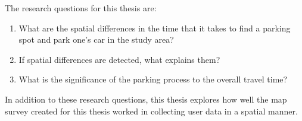 \bigskip
\begin{samepage}
    \noindent
    The research questions for this thesis are:
    
    \begin{spacing}{1}
        \begin{enumerate}[label=\Roman*]
          \item What are the spatial differences in the time that it takes to find a parking spot and park one’s car in the study area?
          \item If spatial differences are detected, what explains them?
          \item What is the significance of the parking process to the overall travel time?
        \end{enumerate}
    \end{spacing}
    \bigskip
    In addition to these research questions, this thesis explores how well the map survey created for this thesis worked in collecting user data in a spatial manner.
\end{samepage}